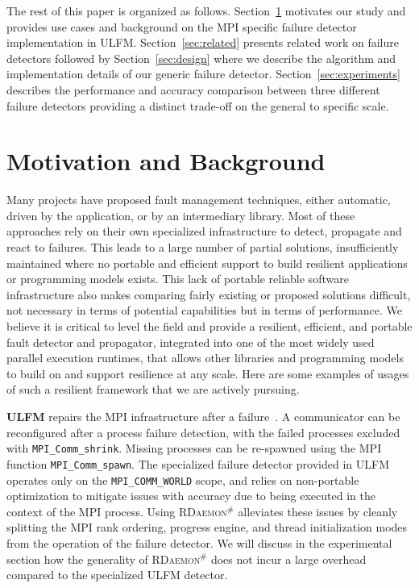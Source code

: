 \documentclass[5p,times,twocolumn]{elsarticle}
\newcommand{\mpifunc}[1]{\lstinline"MPI_#1"\xspace}
\newcommand{\ulfm}[0]{\textsc{ULFM}\xspace}
\newcommand{\mpi}[0]{\textsc{MPI}\xspace}
\newcommand{\ourwork}[0]{\textsc{RDaemon}\ensuremath{^\#}\xspace}
\begin{document}
The rest of this paper is organized as follows. Section~\ref{sec:motivation}
motivates our study and provides use cases and background on the \mpi specific
failure detector implementation in \ulfm. Section~\ref{sec:related} presents
related work on failure detectors followed by Section~\ref{sec:design} where we
describe the algorithm and implementation details of our generic failure
detector. Section~\ref{sec:experiments} describes the performance and accuracy
comparison between three different failure detectors providing a distinct
trade-off on the general to specific scale.

\section{Motivation and Background}\label{sec:motivation}

Many projects have proposed fault management techniques, either automatic,
 driven by the application, or by an intermediary library. Most of these approaches
rely on their own specialized infrastructure to detect, propagate and react to failures.
This leads to a large number of partial solutions, insufficiently maintained where no portable
and efficient support to build resilient applications or programming models exists.
This lack of portable reliable software infrastructure also makes comparing fairly
existing or proposed solutions difficult, not necessary in terms of potential capabilities
but in terms of performance. We believe it is critical to level the field and provide a resilient, efficient, and portable fault detector and propagator, integrated into one of the most widely used parallel execution runtimes, that allows other libraries and programming models to build on and support resilience at any scale. Here are some examples of usages of such a resilient framework that we are actively pursuing.

\textbf{\ulfm} repairs the \mpi infrastructure after a failure~\cite{Bland2013}. A communicator can be reconfigured after a
process failure detection, with the failed processes excluded with \mpifunc{Comm_shrink}. Missing processes
can be re-spawned using the \mpi function \mpifunc{Comm_spawn}. The specialized failure detector provided
in \ulfm operates only on the \mpifunc{COMM_WORLD} scope, and relies on non-portable optimization
to mitigate issues with accuracy due to being executed in the context of the \mpi process.
Using \ourwork alleviates these issues by cleanly splitting the \mpi rank ordering,
progress engine, and thread initialization modes from the operation of the failure
detector. We will discuss in the experimental section how the generality of
\ourwork does not incur a large overhead compared to the specialized \ulfm detector.
\end{document}
